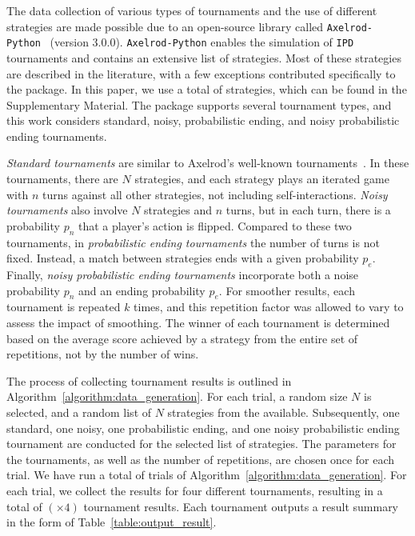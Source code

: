 \documentclass{article}
\newcommand{\uniquenumberofseeds}{}
\newcommand{\numberofalltournaments}{}
\newcommand{\numberofstrategies}{}
\def\axelrod{\texttt{Axelrod-Python}}
\def\IPD{\texttt{IPD}}
\begin{document}
The data collection of various types of tournaments and the use of different
strategies are made possible due to an open-source library called \axelrod{}~\cite{axelrodproject}
(version 3.0.0). \axelrod{} enables the simulation of \IPD{}
tournaments and contains an extensive list of strategies. Most of these
strategies are described in the literature, with a few exceptions contributed
specifically to the package. In this paper, we use a total of
\numberofstrategies strategies, which can be found in the Supplementary
Material. The package supports several tournament types, and this work considers
standard, noisy, probabilistic ending, and noisy probabilistic ending
tournaments.

{\it Standard tournaments} are similar to Axelrod's well-known
tournaments~\cite{Axelrod1980a}. In these tournaments, there are \(N\)
strategies, and each strategy plays an iterated game with \(n\) turns against
all other strategies, not including self-interactions.
{\it Noisy tournaments} also involve \(N\) strategies and \(n\) turns, but
in each turn, there is a probability \(p_n\) that a player's action is
flipped. Compared to these two tournaments, in 
{\it probabilistic ending tournaments} the number of turns is not fixed. Instead,
a match between strategies ends with a given probability
\(p_e\).
Finally, {\it noisy probabilistic ending tournaments} incorporate both a
noise probability \(p_n\) and an ending probability \(p_e\). For smoother
results, each tournament is repeated \(k\) times, and this repetition factor was
allowed to vary to assess the impact of smoothing. The winner of each tournament
is determined based on the average score achieved by a strategy from the entire
set of repetitions, not by the number of wins.

The process of collecting tournament results is outlined in
Algorithm~\ref{algorithm:data_generation}. For each trial, a random size \(N\)
is selected, and a random list of \(N\) strategies from the \numberofstrategies
available. Subsequently, one standard, one noisy, one probabilistic ending, and
one noisy probabilistic ending tournament are conducted for the selected list of
strategies. The parameters for the tournaments, as well as the number of
repetitions, are chosen once for each trial. We have run a total of
\uniquenumberofseeds trials of Algorithm~\ref{algorithm:data_generation}. For
each trial, we collect the results for four different tournaments, resulting in
a total of \numberofalltournaments $(\uniquenumberofseeds \times 4)$ tournament
results. Each tournament outputs a result summary in the form of
Table~\ref{table:output_result}.
\end{document}

